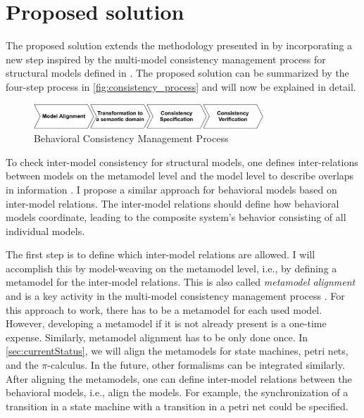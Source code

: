 \documentclass[conference]{IEEEtran}
\begin{document}
\section{Proposed solution}
The proposed solution extends the methodology presented in \cite{engelsMethodologySpecifyingAnalyzing2001} by incorporating a new step inspired by the multi-model consistency management process for structural models defined in \cite{stunkelMultipleModelSynchronization2020}.
The proposed solution can be summarized by the four-step process in \autoref{fig:consistency_process} and will now  be explained in detail.

\begin{figure}[h]
    \centering
    \includegraphics[width=3.4in]{methodology}
    \caption{Behavioral Consistency Management Process}
    \label{fig:consistency_process}
\end{figure}

To check inter-model consistency for structural models, one defines inter-relations between models on the metamodel level and the model level to describe overlaps in information \cite{stunkelMultipleModelSynchronization2020}.
I propose a similar approach for behavioral models based on inter-model relations.
The inter-model relations should define how behavioral models coordinate, leading to the composite system's behavior consisting of all individual models.

The first step is to define which inter-model relations are allowed.
I will accomplish this by model-weaving on the metamodel level, i.e., by defining a metamodel for the inter-model relations.
This is also called \textit{metamodel alignment} and is a key activity in the multi-model consistency management process \cite{stunkelMultipleModelSynchronization2020}.
For this approach to work, there has to be a metamodel for each used model.
However, developing a metamodel if it is not already present is a one-time expense.
Similarly, metamodel alignment has to be only done once.
In \autoref{sec:currentStatus}, we will align the metamodels for state machines, petri nets, and the $\pi$-calculus.
In the future, other formalisms can be integrated similarly.
After aligning the metamodels, one can define inter-model relations between the behavioral models, i.e., align the models.
For example, the synchronization of a transition in a state machine with a transition in a petri net could be specified.
\end{document}
